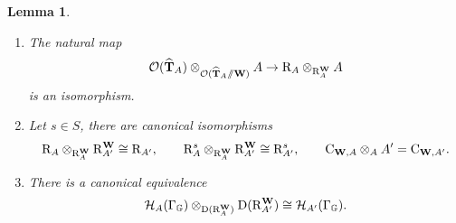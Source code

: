 \documentclass[a4paper, 10pt, oneside, reqno]{amsart}
\theoremstyle{plain}
\newtheorem{lem}[thm]{Lemma}
\theoremstyle{definition}
\theoremstyle{remark}
\newcommand{\Gbb}{\mathbb{G}}
\newcommand{\RR}{\mathrm{R}}
\newcommand{\Cc}{\mathrm{C}}
\begin{document}
\begin{lem}\label{lem:central-specialization}
\begin{enumerate}
\item The natural map 
\begin{equation}\label{eq:reduced-algebra-from-total-torus}
\Ocal(\widehat{\Tbf}_A) \otimes_{\Ocal(\widehat{\Tbf}_A\sslash \Wbf)} A \to \RR_A \otimes_{\RR_A^{\Wbf}} A
\end{equation}
is an isomorphism.
\item Let $s \in S$, there are canonical isomorphisms 
$$\RR_A \otimes_{\RR_{A}^{\Wbf}} \RR_{A'}^{\Wbf} \cong \RR_{A'}, \qquad \RR_{A}^s \otimes_{\RR_{A}^{\Wbf}} \RR_{A'}^{\Wbf} \cong \RR_{A'}^s, \qquad \Cc_{\Wbf,A} \otimes_{A} A' = \Cc_{\Wbf,A'}.$$
\item There is a canonical equivalence 
$$\Hcal_{A}(\Gamma_{\Gbb}) \otimes_{\DD(\RR_A^{\Wbf})} \DD(\RR_{A'}^{\Wbf}) \cong \Hcal_{A'}(\Gamma_{\Gbb}).$$
\end{enumerate}

\end{lem}
\end{document}
